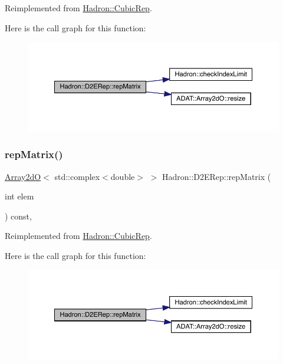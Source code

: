 Reimplemented from \mbox{\hyperlink{structHadron_1_1CubicRep_ac5d7e9e6f4ab1158b5fce3e4ad9e8005}{Hadron\+::\+Cubic\+Rep}}.

Here is the call graph for this function\+:
\nopagebreak
\begin{figure}[H]
\begin{center}
\leavevmode
\includegraphics[width=350pt]{d4/d82/structHadron_1_1D2ERep_a0d6937e2a9cf2e22df238b7e3eafbf8e_cgraph}
\end{center}
\end{figure}
\mbox{\label{structHadron_1_1D2ERep_a0d6937e2a9cf2e22df238b7e3eafbf8e}} 
\subsubsection{\texorpdfstring{repMatrix()}{repMatrix()}\hspace{0.1cm}{\footnotesize\ttfamily [3/3]}}
{\footnotesize\ttfamily \mbox{\hyperlink{classADAT_1_1Array2dO}{Array2dO}}$<$ std\+::complex$<$double$>$ $>$ Hadron\+::\+D2\+E\+Rep\+::rep\+Matrix (\begin{DoxyParamCaption}\item[{int}]{elem }\end{DoxyParamCaption}) const\hspace{0.3cm}{\ttfamily [inline]}, {\ttfamily [virtual]}}



Reimplemented from \mbox{\hyperlink{structHadron_1_1CubicRep_ac5d7e9e6f4ab1158b5fce3e4ad9e8005}{Hadron\+::\+Cubic\+Rep}}.

Here is the call graph for this function\+:
\nopagebreak
\begin{figure}[H]
\begin{center}
\leavevmode
\includegraphics[width=350pt]{d4/d82/structHadron_1_1D2ERep_a0d6937e2a9cf2e22df238b7e3eafbf8e_cgraph}
\end{center}
\end{figure}


